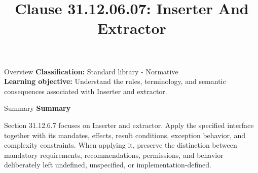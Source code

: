\documentclass[10pt,letterpaper]{article}
\title{Clause 31.12.06.07: Inserter And Extractor}
\author{}
\date{}
\begin{document}
\maketitle
\begin{CornellOverviewBox}{Overview}
\textbf{Classification:} Standard library - Normative\\[2pt]
\textbf{Learning objective:} Understand the rules, terminology, and semantic consequences associated with Inserter and extractor.
\end{CornellOverviewBox}\begin{CornellSummaryBox}{Summary}
{\sffamily\bfseries\color{Accent} Summary}\par\vspace{3pt}Section 31.12.6.7 focuses on Inserter and extractor. Apply the specified interface together with its mandates, effects, result conditions, exception behavior, and complexity constraints. When applying it, preserve the distinction between mandatory requirements, recommendations, permissions, and behavior deliberately left undefined, unspecified, or implementation-defined.
\end{CornellSummaryBox}
\end{document}

